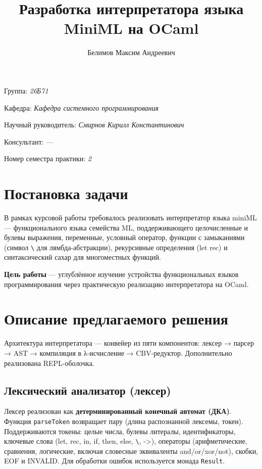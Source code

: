 \documentclass[a4paper]{article}
\title{Разработка интерпретатора языка MiniML на OCaml}
\author{Белимов Максим Андреевич}
\date{}
\begin{document}
\maketitle

\begin{flushright}
    Группа: \emph{26Б71}

    Кафедра: \emph{Кафедра системного программирования}

    Научный руководитель: \emph{Смирнов Кирилл Константинович}
    
    Консультант: \emph{---}
    
    Номер семестра практики: \emph{2}
\end{flushright}


\section{Постановка задачи}

В рамках курсовой работы требовалось реализовать интерпретатор языка miniML — функционального языка семейства ML, поддерживающего целочисленные и булевы выражения, переменные, условный оператор, функции с замыканиями (символ \texttt{\textbackslash} для лямбда-абстракции), рекурсивные определения (let rec) и синтаксический сахар для многоместных функций.

\textbf{Цель работы} — углублённое изучение устройства функциональных языков программирования через практическую реализацию интерпретатора на OCaml.

\section{Описание предлагаемого решения}

Архитектура интерпретатора — конвейер из пяти компонентов: лексер → парсер → AST → компиляция в λ-исчисление → CBV-редуктор. Дополнительно реализована REPL-оболочка.

\subsection{Лексический анализатор (лексер)}

Лексер реализован как \textbf{детерминированный конечный автомат (ДКА)}. Функция \texttt{parseToken} возвращает пару (длина распознанной лексемы, токен). Поддерживаются токены: целые числа, булевы литералы, идентификаторы, ключевые слова (let, rec, in, if, then, else, \texttt{\textbackslash}, ->), операторы (арифметические, сравнения, логические, включая словесные эквиваленты and/or/xor/not), скобки, EOF и INVALID. Для обработки ошибок используется монада \texttt{Result}.
\end{document}
